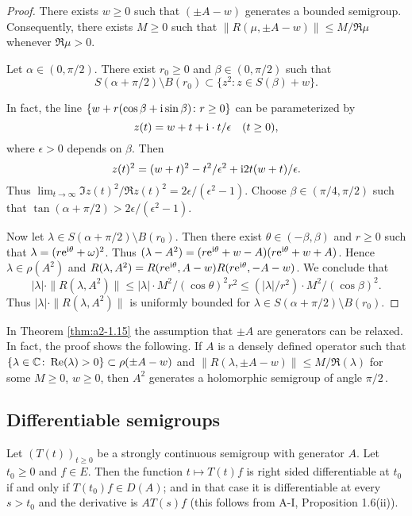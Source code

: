 \begin{proof}
There exists $w \geq 0$ such that $(\pm A - w)$ generates a bounded semigroup.
Consequently, there exists $M \geq 0$ such that $\|R(\mu,\pm A - w)\| \leq M/\Re\mu$ whenever $\Re\mu > 0$.

Let $\alpha \in (0,\pi/2)$.
There exist $r_0 \geq 0$ and $\beta \in (0,\pi/2)$ such that
\[
    S(\alpha+\pi/2)\setminus B(r_{0}) \subset \{ z^2 \colon z \in S(\beta) + w \}.
\]

In fact, the line 
$ \{w + r(\cos\beta + \mathrm{i} \sin\beta) \colon r \geq 0\} $ 
can be parameterized by 
%
\[
	 z(t) = w + t + \mathrm{i}\cdot t/\epsilon \quad (t \geq 0) ,
\]
%
where $\epsilon > 0$ depends on $\beta$.
Then 
%
\[
	z(t)^2 = (w + t)^2 - t^2/\epsilon^2 + \mathrm{i} 2t(w+t)/\epsilon .
\]
%
Thus $\lim_{t \to \infty} \Im z(t)^2/\Re z(t)^2 = 2\epsilon/(\epsilon^2-1)$.
Choose $\beta \in (\pi/4,\pi/2)$ such that $\tan(\alpha + \pi/2) > 2\epsilon/(\epsilon^2-1)$. 

Now let $\lambda \in S(\alpha+\pi/2)\setminus B(r_{0})$.
Then there exist $\theta \in (-\beta,\beta)$ 
and $r \geq 0$
such that $\lambda = (r\mathrm{e}^{\mathrm{i}\theta}+\omega)^2$.
Thus $(\lambda-A^2) = (r\mathrm{e}^{\mathrm{i}\theta}+w - A)(r\mathrm{e}^{\mathrm{i}\theta}+w + A)$.
Hence $\lambda \in \rho(A^2)$ and $R(\lambda,A^2) = R(r\mathrm{e}^{\mathrm{i}\theta},A-w)R(r\mathrm{e}^{\mathrm{i}\theta},-A-w)$.
We conclude that 
\[
|\lambda| \cdot \|R(\lambda,A^2)\| \leq |\lambda| \cdot M^2/(\cos\theta)^2r^2 \leq (|\lambda|/r^2)\cdot M^2/(\cos\beta)^2.
\]
Thus $|\lambda| \cdot \|R(\lambda,A^2)\|$ is uniformly bounded for $\lambda \in S(\alpha+\pi/2) \setminus B(r_0)$.
\end{proof}
\begin{remark*}\label{rem:a2-1.7-kgk}
In Theorem  \ref{thm:a2-1.15}  
the assumption that $\pm A$ are generators can be relaxed.
In fact, the proof shows the following.
If $A$ is a densely defined operator such that 
$\{\lambda \in \mathbb{C} \colon \mathop{}\!\mathrm{Re}(\lambda) > 0\} \subset \rho(\pm A - w)$ and 
$\|R(\lambda,\pm A - w)\| \leq M/\Re(\lambda)$ for some $M \geq 0$, $w \geq 0$, then $A^2$ generates a holomorphic semigroup of angle $\pi/2$\,.
\end{remark*}

\subsection{Differentiable semigroups} \label{subsec:a2-1.se5}%
Let $(T(t))_{t\geq 0}$ be a strongly continuous semigroup with generator $A$.
Let $t_0 \geq 0$ and $f \in E$.
Then the function $t \mapsto T(t)f$ is right sided differentiable at $t_0$ if and only if $T(t_0)f \in D(A)$; and in that case it is differentiable at every $s > t_0$ and the derivative is $AT(s)f$ (this follows from A-I, Proposition 1.6(ii)).

